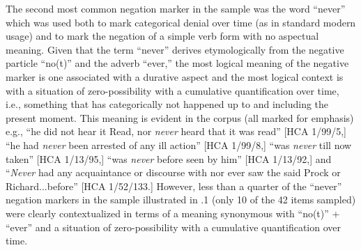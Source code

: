 The second most common negation marker in the sample was the word “never” which was used both to mark categorical denial over time (as in standard modern usage) and to mark the negation of a simple verb form with no aspectual meaning. Given that the term “never” derives etymologically from the negative particle “no(t)” and the adverb “ever,” the most logical meaning of the negative marker is one associated with a durative aspect and the most logical context is with a situation of zero-possibility with a cumulative quantification over time, i.e., something that has categorically not happened up to and including the present moment. This meaning is evident in the corpus (all marked for emphasis) e.g., “he did not hear it Read, nor \textit{never} heard that it was read” [HCA 1/99/5,] “he had \textit{never} been arrested of any ill action” [HCA 1/99/8,] “was \textit{never} till now taken” [HCA 1/13/95,] “was \textit{never} before seen by him” [HCA 1/13/92,] and “\textit{Never} had any acquaintance or discourse with nor ever saw the said Prock or Richard...before” [HCA 1/52/133.] However, less than a quarter of the “never” negation markers in the sample illustrated in .1 (only 10 of the 42 items sampled) were clearly contextualized in terms of a meaning synonymous with “no(t)” + “ever” and a situation of zero-possibility with a cumulative quantification over time. 

